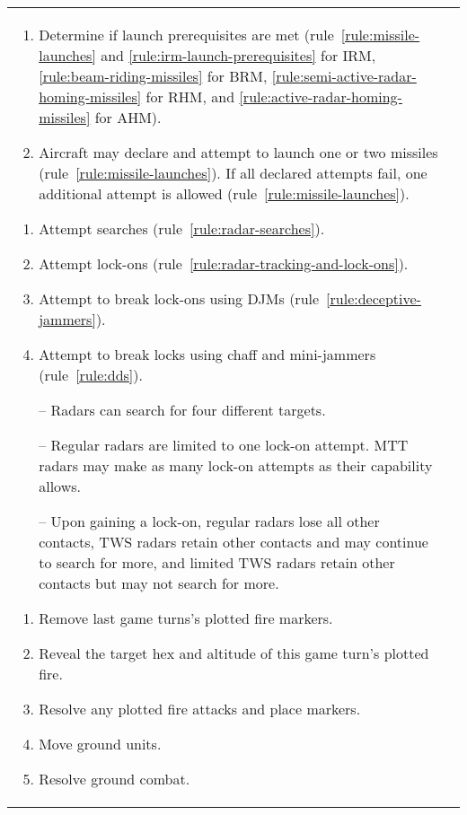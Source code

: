 \begin{twocolumntable}
\begin{tabularx}{1.0\linewidth}{L@{\hspace{\columnsep}}L}
{\begin{enumerate}[start=7]

\begin{enumerate}[nosep]
    \item Determine if launch prerequisites are met (rule~\ref{rule:missile-launches} and \ref{rule:irm-launch-prerequisites} for IRM, \ref{rule:beam-riding-missiles} for BRM, \ref{rule:semi-active-radar-homing-missiles} for RHM, and \ref{rule:active-radar-homing-missiles} for AHM).
    \item Aircraft may declare and attempt to launch one or two missiles (rule~\ref{rule:missile-launches}). If all declared attempts fail, one additional attempt is allowed (rule~\ref{rule:missile-launches}).
\end{enumerate}


\begin{enumerate}[nosep]
    \item Attempt searches (rule~\ref{rule:radar-searches}).
    \item Attempt lock-ons (rule~\ref{rule:radar-tracking-and-lock-ons}).
    \item Attempt to break lock-ons using DJMs (rule~\ref{rule:deceptive-jammers}).
    \item Attempt to break locks using chaff and mini-jammers (rule~\ref{rule:dds}).
    \item[--] Radars can search for four different targets.
    \item[--] Regular radars are limited to one lock-on attempt. MTT radars may make as many lock-on attempts as their capability allows.
    \item[--] Upon gaining a lock-on, regular radars lose all other contacts, TWS radars retain other contacts and may continue to search for more, and limited TWS radars retain other contacts but may not search for more.    
\end{enumerate}


\begin{enumerate}[nosep]
    \item Remove last game turns's plotted fire markers.
    \item Reveal the target hex and altitude of this game turn's plotted fire.
    \item Resolve any plotted fire attacks and place markers.
    \item Move ground units.
    \item Resolve ground combat.
\end{enumerate}


\end{enumerate}}
\end{tabularx}
\end{twocolumntable}
